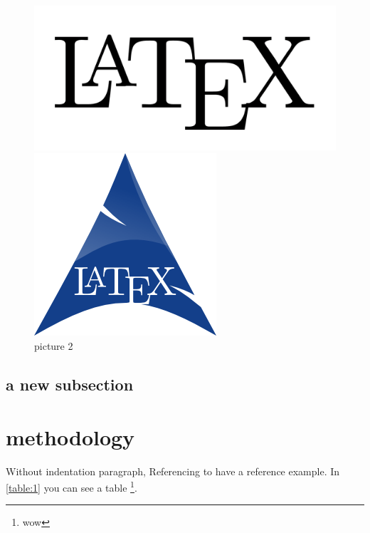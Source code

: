 \documentclass[12pt]{article}
\begin{document}
\begin{figure}[h!]
	\centering
	\begin{minipage}[t]{.5\textwidth}
		\centering
		\includegraphics[width=1\linewidth]{pic/Picture1.png}
		\caption{picture 1}
		\label{fig:1}
	\end{minipage}%
	\begin{minipage}[t]{.5\textwidth}
		\centering
		\includegraphics[width=0.5\linewidth]{pic/Picture2.png}
		\caption{picture 2}
		\label{fig:2}
	\end{minipage}
\end{figure}

\subsection{a new subsection}
\lipsum[3]

\newpage
\section{methodology}
\par
\lipsum[3]
\noindent
Without indentation paragraph, Referencing \cite{ref2} to have a reference example. In \autoref{table:1} you can see a table \footnote{wow}.
\end{document}
